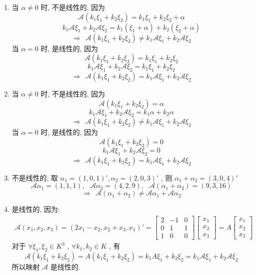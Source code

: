 \documentclass[11pt,a4paper,openany,oneside]{book}
\begin{document}
\begin{enumerate}[(1)]
	\item  当 $ \alpha \neq 0 $ 时, 不是线性的, 因为
 $$  \mathcal{A}(k_1\xi_1 + k_2\xi_2) = k_1\xi_1 + k_2\xi_2 + \alpha   $$  
 $$  k_1\mathcal{A}\xi_1 + k_2\mathcal{A}\xi_2 = k_1(\xi_1 + \alpha) + k_2(\xi_2 + \alpha)  $$ 
 $$  \Longrightarrow \ \ \mathcal{A}(k_1\xi_1 + k_2\xi_2) \neq k_1\mathcal{A}\xi_1 + k_2\mathcal{A}\xi_2  $$ 
\hspace{1.5em} 当 $ \alpha = 0 $ 时, 是线性的, 因为
 $$  \mathcal{A}(k_1\xi_1 + k_2\xi_2) = k_1\xi_1 + k_2\xi_2   $$  
 $$  k_1\mathcal{A}\xi_1 + k_2\mathcal{A}\xi_2 = k_1\xi_1  + k_2\xi_2   $$ 
 $$  \Longrightarrow \ \ \mathcal{A}(k_1\xi_1 + k_2\xi_2) = k_1\mathcal{A}\xi_1 + k_2\mathcal{A}\xi_2  $$ 

\item  当 $ \alpha \neq 0 $ 时, 不是线性的, 因为
 $$  \mathcal{A}(k_1\xi_1 + k_2\xi_2) = \alpha     $$ 
 $$  k_1\mathcal{A}\xi_1 + k_2\mathcal{A}\xi_2 = k_1\alpha + k_2\alpha  $$ 
 $$  \Longrightarrow \ \ \mathcal{A}(k_1\xi_1 + k_2\xi_2) \neq  k_1\mathcal{A}\xi_1 + k_2\mathcal{A}\xi_2  $$ 
\hspace{1.5em} 当 $ \alpha = 0 $ 时, 是线性的, 因为
 $$  \mathcal{A}(k_1\xi_1 + k_2\xi_2) = 0    $$ 
 $$  k_1\mathcal{A}\xi_1 + k_2\mathcal{A}\xi_2 =0  $$ 
 $$  \Longrightarrow \ \ \mathcal{A}(k_1\xi_1 + k_2\xi_2) =  k_1\mathcal{A}\xi_1 + k_2\mathcal{A}\xi_2  $$ 

\item  不是线性的, 取 $ \alpha_1 = (1, 0, 1)', \alpha_2 = (2, 0, 3)' $ , 则 $ \alpha_1 + \alpha_2 = (3,0,4)' $ 
 $$  \mathcal{A}\alpha_1 = (1, 1, 1),  \ \ \ \mathcal{A}\alpha_2 = (4, 2, 9), \ \ \ \mathcal{A}(\alpha_1 + \alpha_2) = (9, 3, 16)  $$ 
 $$  \Longrightarrow \ \ \mathcal{A}(\alpha_1 + \alpha_2) \neq \mathcal{A}\alpha_1 + \mathcal{A}\alpha_2  $$ 

\item  是线性的, 因为:
\begin{gather*}
\mathcal{A}(x_1, x_2, x_3) = (2x_1-x_2, x_2 + x_3 , x_1)'=
\begin{bmatrix}
2  &  -1  &  0  \\
0  &  1  &  1  \\
1  &  0  &  0
\end{bmatrix}
\begin{bmatrix}
x_1 \\ x_2  \\ x_3
\end{bmatrix}
=A
\begin{bmatrix}
x_1 \\ x_2  \\ x_3
\end{bmatrix}
\end{gather*}
对于 $ \forall \xi_1, \xi_2 \in K^3 $ ,  $ \forall k_1, k_2 \in K $ , 有
 $$  \mathcal{A}(k_1\xi_1 + k_2\xi_2) = A(k_1\xi_1 + k_2\xi_2) = k_1A\xi_1 + k_2\xi_2 = k_1\mathcal{A}\xi_1 + k_2\mathcal{A}\xi_2  $$ 
所以映射 $ \mathcal{A} $ 是线性的. \\


\end{enumerate}
\end{document}
